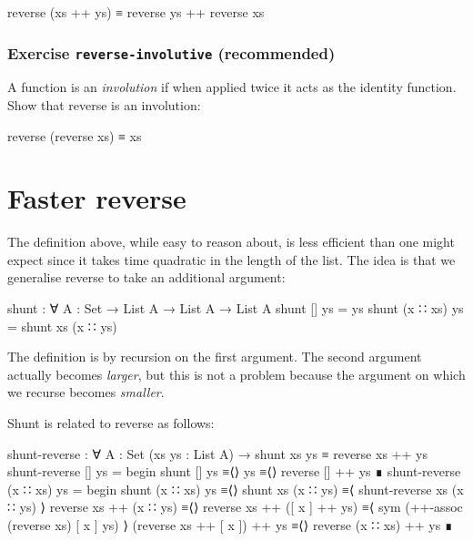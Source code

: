 \begin{myDisplay}
reverse (xs ++ ys) ≡ reverse ys ++ reverse xs
\end{myDisplay}

\hypertarget{exercise-reverse-involutive-recommended}{%
\subsubsection{\texorpdfstring{Exercise \texttt{reverse-involutive}
(recommended)}{Exercise reverse-involutive (recommended)}}\label{exercise-reverse-involutive-recommended}}

A function is an \emph{involution} if when applied twice it acts as the
identity function. Show that reverse is an involution:

\begin{myDisplay}
reverse (reverse xs) ≡ xs
\end{myDisplay}

\hypertarget{faster-reverse}{%
\section{Faster reverse}\label{faster-reverse}}

The definition above, while easy to reason about, is less efficient than
one might expect since it takes time quadratic in the length of the
list. The idea is that we generalise reverse to take an additional
argument:

\begin{fence}
\begin{code}
shunt : ∀ {A : Set} → List A → List A → List A
shunt []       ys  =  ys
shunt (x ∷ xs) ys  =  shunt xs (x ∷ ys)
\end{code}
\end{fence}

The definition is by recursion on the first argument. The second
argument actually becomes \emph{larger}, but this is not a problem
because the argument on which we recurse becomes \emph{smaller}.

Shunt is related to reverse as follows:

\begin{fence}
\begin{code}
shunt-reverse : ∀ {A : Set} (xs ys : List A)
  → shunt xs ys ≡ reverse xs ++ ys
shunt-reverse [] ys =
  begin
    shunt [] ys
  ≡⟨⟩
    ys
  ≡⟨⟩
    reverse [] ++ ys
  ∎
shunt-reverse (x ∷ xs) ys =
  begin
    shunt (x ∷ xs) ys
  ≡⟨⟩
    shunt xs (x ∷ ys)
  ≡⟨ shunt-reverse xs (x ∷ ys) ⟩
    reverse xs ++ (x ∷ ys)
  ≡⟨⟩
    reverse xs ++ ([ x ] ++ ys)
  ≡⟨ sym (++-assoc (reverse xs) [ x ] ys) ⟩
    (reverse xs ++ [ x ]) ++ ys
  ≡⟨⟩
    reverse (x ∷ xs) ++ ys
  ∎
\end{code}
\end{fence}

